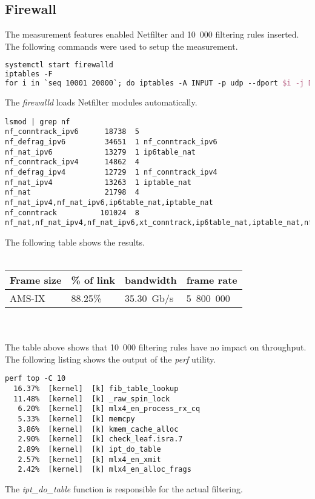 
\subsection{Firewall}
The measurement features enabled Netfilter and 10~000 filtering rules inserted.
The following commands were used to setup the measurement.
\begin{lstlisting}[language=TeX]
systemctl start firewalld
iptables -F
for i in `seq 10001 20000`; do iptables -A INPUT -p udp --dport $i -j DROP; done
\end{lstlisting}
The {\it{firewalld}} loads Netfilter modules automatically.
\begin{lstlisting}
lsmod | grep nf
nf_conntrack_ipv6      18738  5 
nf_defrag_ipv6         34651  1 nf_conntrack_ipv6
nf_nat_ipv6            13279  1 ip6table_nat
nf_conntrack_ipv4      14862  4 
nf_defrag_ipv4         12729  1 nf_conntrack_ipv4
nf_nat_ipv4            13263  1 iptable_nat
nf_nat                 21798  4 nf_nat_ipv4,nf_nat_ipv6,ip6table_nat,iptable_nat
nf_conntrack          101024  8 nf_nat,nf_nat_ipv4,nf_nat_ipv6,xt_conntrack,ip6table_nat,iptable_nat,nf_conntrack_ipv4,nf_conntrack_ipv6
\end{lstlisting}
The following table shows the results.
\\
\\
\begin{tabular}{ | l | l | l | l | }
\hline
Frame size & \% of link & bandwidth & frame rate \\
\hline
AMS-IX & 88.25\% & 35.30~Gb/s & 5~800~000 \\
\hline
\end{tabular}
\\
\\
The table above shows that 10~000 filtering rules have no impact on throughput.
The following listing shows the output of the {\it{perf}} utility.
\begin{lstlisting}
perf top -C 10
  16.37%  [kernel]  [k] fib_table_lookup
  11.48%  [kernel]  [k] _raw_spin_lock
   6.20%  [kernel]  [k] mlx4_en_process_rx_cq
   5.33%  [kernel]  [k] memcpy
   3.86%  [kernel]  [k] kmem_cache_alloc
   2.90%  [kernel]  [k] check_leaf.isra.7
   2.89%  [kernel]  [k] ipt_do_table
   2.57%  [kernel]  [k] mlx4_en_xmit
   2.42%  [kernel]  [k] mlx4_en_alloc_frags
\end{lstlisting}
The {\it{ipt\_do\_table}} function is responsible for the actual filtering.
